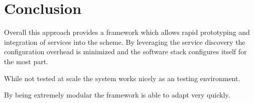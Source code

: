 \section{Conclusion}
Overall this approach provides a framework which allows rapid prototyping and integration of services into the scheme.
By leveraging the service discovery the configuration overhead is minimized and the software stack configures itself for the most part.

While not tested at scale the system works nicely as an testing environment.

By being extremely modular the framework is able to adapt very quickly.
